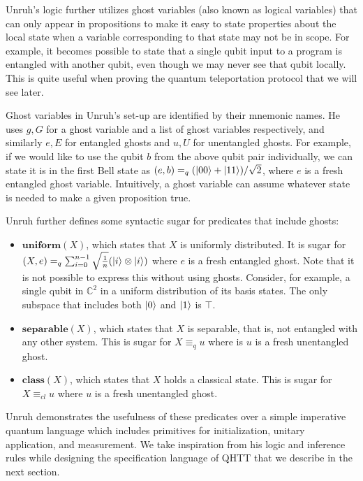 Unruh's logic further utilizes ghost variables (also known as logical variables) that can only appear in propositions to make it easy to state properties about the local state when a variable corresponding to that state may not be in scope. For example, it becomes possible to state that a single qubit input to a program is entangled with another qubit, even though we may never see that qubit locally. This is quite useful when proving the quantum teleportation protocol that we will see later.

Ghost variables in Unruh's set-up are identified by their mnemonic names. He uses $g, G$ for a ghost variable and a list of ghost variables respectively, and similarly $e, E$ for entangled ghosts and $u, U$ for unentangled ghosts. For example, if we would like to use the qubit $b$ from the above qubit pair individually, we can state it is in the first Bell state as $(e, b) =_q (\ket{00}+\ket{11})/\sqrt{2}$, where $e$ is a fresh entangled ghost variable. Intuitively, a ghost variable can assume whatever state is needed to make a given proposition true.

Unruh further defines some syntactic sugar for predicates that include ghosts:

\begin{itemize}
    \item $\mathbf{uniform}(X)$, which states that $X$ is uniformly distributed. It is sugar for $(X, e) =_q \sum_{i=0}^{n-1}  \sqrt{\frac{1}{n}} (\ket{i} \otimes \ket{i})$ where $e$ is a fresh entangled ghost.
    Note that it is not possible to express this without using ghosts. Consider, for example, a single qubit in $\mathbb{C}^2$ in a uniform distribution of its basis states. The only subspace that includes both $\ket{0}$ and $\ket{1}$ is $\top$.
	\item $\mathbf{separable}(X)$, which states that $X$ is separable, that is, not entangled with any other system. This is sugar for $X \equiv_q u$ where is $u$ is a fresh unentangled ghost.
	\item $\mathbf{class}(X)$, which states that $X$ holds a classical state. This is sugar for $X \equiv_{cl} u$ where $u$ is a fresh unentangled ghost.
\end{itemize}

Unruh demonstrates the usefulness of these predicates over a simple imperative quantum language which includes primitives for initialization, unitary application, and measurement. We take inspiration from his logic and inference rules while designing the specification language of QHTT that we describe in the next section.

